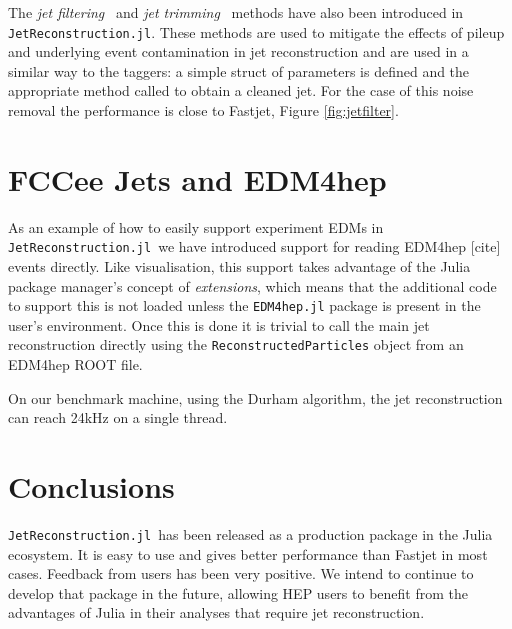 \documentclass{webofc}
\newcommand{\JR}{\texttt{JetReconstruction.jl}}
\begin{document}
\begin{figure}[h]

\end{figure}

The \emph{jet filtering}~\cite{Butterworth_2008} and \emph{jet
trimming}~\cite{Krohn_2010} methods have also been introduced in \JR. These
methods are used to mitigate the effects of pileup and underlying event
contamination in jet reconstruction and are used in a similar way to the
taggers: a simple struct of parameters is defined and the appropriate method
called to obtain a cleaned jet. For the case of this noise removal the
performance is close to Fastjet, Figure \ref{fig:jetfilter}.

\section{FCCee Jets and EDM4hep}
\label{sec:fccee}

As an example of how to easily support experiment EDMs in \JR\ we have
introduced support for reading EDM4hep [cite] events directly. Like
visualisation, this support takes advantage of the Julia package manager's
concept of \emph{extensions}, which means that the additional code to support
this is not loaded unless the \texttt{EDM4hep.jl} package is present in the
user's environment. Once this is done it is trivial to call the main jet
reconstruction directly using the \texttt{ReconstructedParticles} object from an
EDM4hep ROOT file.

On our benchmark machine, using the Durham algorithm, the jet reconstruction can
reach 24kHz on a single thread.

\section{Conclusions}
\label{sec:conclusions}

\JR\ has been released as a production package in the Julia ecosystem. It is
easy to use and gives better performance than Fastjet in most cases. Feedback
from users has been very positive. We intend to continue to develop that package
in the future, allowing HEP users to benefit from the advantages of Julia in
their analyses that require jet reconstruction.

\sloppy
\raggedright

\end{document}
